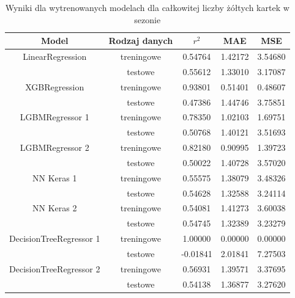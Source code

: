 \documentclass{article}
\begin{document}
\begin{table}[H]
\centering
\begin{tabular}{|c|c|c|c|c|}
\hline
Model & Rodzaj danych & $r^2$ & MAE & MSE \\ \hline
\cline{2-5}
LinearRegression & treningowe & 0.54764 & 1.42172 & 3.54680 \\
\cline{2-5}
& testowe & 0.55612 & 1.33010 & 3.17087 \\
\hline
XGBRegression & treningowe & 0.93801 & 0.51401 & 0.48607 \\
\cline{2-5}
& testowe & 0.47386 & 1.44746 & 3.75851 \\
\hline
LGBMRegressor 1 & treningowe & 0.78350 & 1.02103 & 1.69751 \\
\cline{2-5}
& testowe & 0.50768 & 1.40121 & 3.51693 \\
\hline
LGBMRegressor 2 & treningowe & 0.82180 & 0.90995 & 1.39723 \\
\cline{2-5}
& testowe & 0.50022 & 1.40728 & 3.57020 \\
\hline
NN Keras 1 & treningowe & 0.55575 & 1.38079 & 3.48326 \\
\cline{2-5}
& testowe & 0.54628 & 1.32588 & 3.24114 \\
\hline
NN Keras 2 & treningowe & 0.54081 & 1.41273 & 3.60038 \\
\cline{2-5}
& testowe & 0.54745 & 1.32389 & 3.23279 \\
\hline
DecisionTreeRegressor 1 & treningowe & 1.00000 & 0.00000 & 0.00000 \\
\cline{2-5}
& testowe & -0.01841 & 2.01841 & 7.27503 \\
\hline
DecisionTreeRegressor 2 & treningowe & 0.56931 & 1.39571 & 3.37695 \\
\cline{2-5}
& testowe & 0.54138 & 1.36877 & 3.27620 \\
\hline
\end{tabular}
\caption{Wyniki dla wytrenowanych modelach dla całkowitej liczby żółtych kartek w sezonie}
\end{table}
\end{document}
